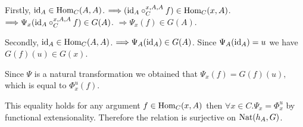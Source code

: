 \documentclass[10pt,a4paper]{article}
\begin{document}
Firstly, ${\textrm{id}}_A \in {\textrm{Hom}}_C(A,A)$. $\Longrightarrow ({\textrm{id}}_A \circ_C^{x,A,A} f) \in {\textrm{Hom}}_C(x,A)$. $\Longrightarrow \Psi_x({\textrm{id}}_A \circ_C^{x,A,A} f)\in G(A)$. $\Longrightarrow \Psi_x(f)\in G(A)$.

Secondly, ${\textrm{id}}_A \in {\textrm{Hom}}_C(A,A)$. $\Longrightarrow \Psi_A({\textrm{id}}_A) \in G(A)$. Since $\Psi_A({\textrm{id}}_A)=u$ we have $G(f)(u)\in G(x)$.

Since $\Psi$ is a natural transformation we obtained that $\Psi_x(f)=G(f)(u),$ which is equal to $\Phi^u_x(f)$.

This equality holds for any argument $f\in {\textrm{Hom}}_C(x,A)$ then $\forall x\in C. \Psi_x=\Phi^u_x$ by functional extensionality. Therefore the relation is surjective on ${\textrm{Nat}}(h_A,G)$.
\myqed
\end{document}
